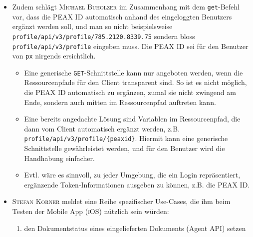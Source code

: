 \begin{itemize}
\begin{itemize}
        \item \textsc{Go} bietet jedoch mit \texttt{json.Indent} eine sehr komfortable Funktion, womit ein beliebiger JSON-Payload\footnote{D.h. nicht nur ein JSON-Payload, dessen Struktur mittels einer \texttt{struct} und den entsprechenden Annotations beschrieben ist, was zu einem unverhältnismässigen Mehraufwand führen würde, zumal dann jeder mögliche Payload statisch beschrieben sein müsste.} einfach formatiert werden kann.
        \item Der Vorschlag soll umgesetzt werden. Weitere Features im Zusammenhang mit generischer JSON-Verarbeitung sollen jedoch der \textsc{Unix}-Philosophie entsprechend an \texttt{jq} oder ähnliche Programme mittels Pipe delegiert werden.
    \end{itemize}
\item Zudem schlägt \textsc{Michael Buholzer} im Zusammenhang mit dem \texttt{get}-Befehl vor, dass die PEAX ID automatisch anhand des eingeloggten Benutzers ergänzt werden soll, und man so nicht beispielsweise \texttt{profile/api/v3/profile/785.2120.8339.75} sondern bloss \texttt{profile/api/v3/profile} eingeben muss. Die PEAX ID sei für den Benutzer von \texttt{px} nirgends ersichtlich.
    \begin{itemize}
        \item Eine generische \texttt{GET}-Schnittstelle kann nur angeboten werden, wenn die Ressourcenpfade für den Client transparent sind. So ist es nicht möglich, die PEAX ID automatisch zu ergänzen, zumal sie nicht zwingend am Ende, sondern auch mitten im Ressourcenpfad auftreten kann.
        \item Eine bereits angedachte Lösung sind Variablen im Ressourcenpfad, die dann vom Client automatisch ergänzt werden, z.B. \texttt{profile/api/v3/profile/\{peaxid\}}. Hiermit kann eine generische Schnittstelle gewährleistet werden, und für den Benutzer wird die Handhabung einfacher.
        \item Evtl. wäre es sinnvoll, zu jeder Umgebung, die ein Login repräsentiert, ergänzende Token-Informationen ausgeben zu können, z.B. die PEAX ID.
    \end{itemize}
    \item \textsc{Stefan Korner} meldet eine Reihe spezifischer Use-Cases, die ihm beim Testen der Mobile App (\textsc{iOS}) nützlich sein würden:
        \begin{enumerate}
            \item den Dokumentstatus eines eingelieferten Dokuments (Agent API) setzen

\end{enumerate}
\end{itemize}
